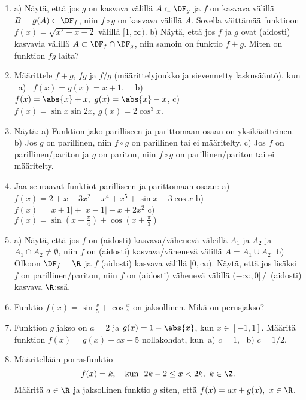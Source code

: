 \begin{enumerate}
\item
a) Näytä, että jos $g$ on kasvava välillä $A\subset\DF_g$ ja $f$ on kasvava välillä 
$B=g(A)\subset\DF_f$, niin $f \circ g$ on kasvava välillä $A$. Sovella väittämää funktioon
$f(x)=\sqrt{x^2+x-2}$ välillä $[1,\infty)$. \newline
b) Näytä, että jos $f$ ja $g$ ovat (aidosti) kasvavia välillä $A\subset\DF_f\cap\DF_g$, niin
samoin on funktio $f+g$. Miten on funktion $fg$ laita?

\item
Määrittele $f+g$, $fg$ ja $f/g$ (määrittelyjoukko ja sievennetty laskusääntö), kun \ 
a) \ $f(x)=g(x)=x+1$, \ \ 
b) \ $f(x)=\abs{x}+x,\ g(x)=\abs{x}-x$, \newline
c) \ $f(x)=\sin x \sin 2x,\ g(x)=2\cos^3 x$.

\item
Näytä: a) Funktion jako parilliseen ja parittomaan osaan on yksikäsitteinen.
b) Jos $g$ on parillinen, niin $f \circ g$ on parillinen tai ei määritelty.
c) Jos $f$ on parillinen/pariton ja $g$ on pariton, niin $f \circ g$ on parillinen/pariton
   tai ei määritelty.

\item
Jaa seuraavat funktiot parilliseen ja parittomaan osaan: \newline
a) \ $f(x)=2+x-3x^2+x^4+x^5+\sin x-3\cos x$ \newline
b) \ $f(x)=|x+1|+|x-1|-x+2x^2$\newline
c) \ $f(x)=\sin(x+\frac{\pi}{4})+\cos(x+\frac{\pi}{3})$

\item \label{H-IV-1: näyttöjä}
a) Näytä, että jos $f$ on (aidosti) kasvava/vähenevä väleillä $A_1$ ja $A_2$ ja
$A_1 \cap A_2 \neq \emptyset$, niin $f$ on (aidosti) kasvava/vähenevä välillä 
$A=A_1 \cup A_2$. \newline
b) Olkoon $\DF_f=\R$ ja $f$ (aidosti) kasvava välillä $[0,\infty)$. Näytä, että jos lisäksi
$f$ on parillinen/pariton, niin $f$ on (aidosti) vähenevä välillä $(-\infty,0]$\,/\, 
(aidosti) kasvava $\R$:ssä.

\item
Funktio $f(x)=\sin\frac{x}{5}+\cos\frac{x}{7}$ on jaksollinen. Mikä on perusjakso? 

\item
Funktion $g$ jakso on $a=2$ ja $g(x)=1-\abs{x}$, kun $x\in[-1,1]$. Määritä funktion
$f(x)=g(x)+cx-5$ nollakohdat, kun\, a) $c=1$, \ b) $c=1/2$.

\item
Määritellään porrasfunktio
\[
f(x)=k, \quad \text{kun}\ \ 2k-2 \le x < 2k,\ k\in\Z.
\]
Määritä $a\in\R$ ja jaksollinen funktio $g$ siten, että $f(x)=ax+g(x),\ x\in\R$.


\end{enumerate}
